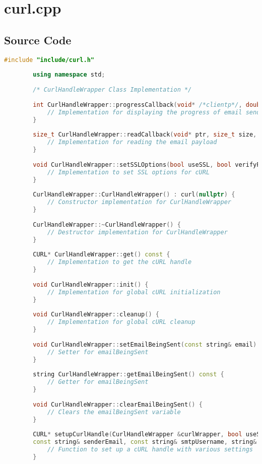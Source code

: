 \documentclass{article}
\begin{document}
	\section{curl.cpp}
	
	\subsection*{Source Code}
	\begin{mdframed}[backgroundcolor=background, hidealllines=false, innerleftmargin=15pt, innerrightmargin=5pt, innertopmargin=0pt, innerbottommargin=-5pt]
	\begin{lstlisting}[language=C++]
		#include "include/curl.h"
		
		using namespace std;
		
		/* CurlHandleWrapper Class Implementation */
		
		int CurlHandleWrapper::progressCallback(void* /*clientp*/, double dltotal, double dlnow, double /*ultotal*/, double /*ulnow*/) {
			// Implementation for displaying the progress of email sending
		}
		
		size_t CurlHandleWrapper::readCallback(void* ptr, size_t size, size_t nmemb, void* userp) {
			// Implementation for reading the email payload
		}
		
		void CurlHandleWrapper::setSSLOptions(bool useSSL, bool verifyPeer, bool verifyHost) {
			// Implementation to set SSL options for cURL
		}
		
		CurlHandleWrapper::CurlHandleWrapper() : curl(nullptr) {
			// Constructor implementation for CurlHandleWrapper
		}
		
		CurlHandleWrapper::~CurlHandleWrapper() {
			// Destructor implementation for CurlHandleWrapper
		}
		
		CURL* CurlHandleWrapper::get() const {
			// Implementation to get the cURL handle
		}
		
		void CurlHandleWrapper::init() {
			// Implementation for global cURL initialization
		}
		
		void CurlHandleWrapper::cleanup() {
			// Implementation for global cURL cleanup
		}
		
		void CurlHandleWrapper::setEmailBeingSent(const string& email) {
			// Setter for emailBeingSent
		}
		
		string CurlHandleWrapper::getEmailBeingSent() const {
			// Getter for emailBeingSent
		}
		
		void CurlHandleWrapper::clearEmailBeingSent() {
			// Clears the emailBeingSent variable
		}
		
		CURL* setupCurlHandle(CurlHandleWrapper &curlWrapper, bool useSSL, bool verifyPeer, bool verifyHost, bool verbose, 
		const string& senderEmail, const string& smtpUsername, string& mailPassDecrypted, int smtpPort, const string& smtpServer) {
			// Function to set up a cURL handle with various settings
		}
	\end{lstlisting}
	\end{mdframed}
\end{document}

